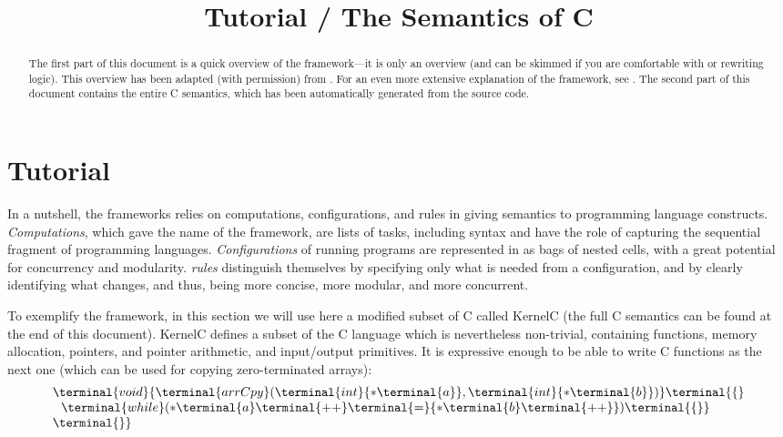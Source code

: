\documentclass{article}
\title{\K Tutorial \slash{} The Semantics of C}
\begin{document}
\maketitle

\begin{abstract}The first part of this document is a quick overview of the \K framework---it is only an overview (and can be skimmed if you are comfortable with \K or rewriting logic).  This overview has been adapted (with permission) from \citet{serbanuta-2010-thesis}.  For an even more extensive explanation of the \K framework, see \citet{rosu-serbanuta-2010-jlap}.  The second part of this document contains the entire C semantics, which has been automatically generated from the source code.
\end{abstract}
\pagebreak
\section{\K Tutorial}
In a nutshell, the \K frameworks relies on computations, configurations, and \K rules in giving semantics to programming language constructs.  
{\em Computations}, which gave the name of the framework, are lists of tasks, including syntax and have the role of capturing the sequential fragment of programming languages.  {\em Configurations} of running programs are represented in \K as bags of nested cells, with a great potential for concurrency and modularity.  {\em \K rules} distinguish themselves by specifying only what is needed from a configuration, and by clearly identifying what changes, and thus, being more concise, more modular, and more concurrent.

To exemplify the \K framework, in this section we will use here a modified subset of C called {\sc KernelC} (the full C semantics can be found at the end of this document).   {\sc KernelC} defines a subset of the C language which is nevertheless non-trivial, containing functions, memory allocation, pointers, and pointer arithmetic, and input/output primitives.  It is expressive enough to be able to write C functions as the next one (which can be used for copying zero-terminated arrays):
\[\begin{array}{l}
\terminal{void}
{
  {\terminal{arrCpy}
  }
  (\terminal{int}{
    \ast\terminal{a}
    }, \terminal{int}{
     \ast\terminal{b}
     }
     ) }
     \terminal{\{} \\
     \ \ \terminal{while}   (
     {  
       {\ast\terminal{a}}
       \terminal{++}
     }\terminal{=}
     {
     {\ast\terminal{b}}
     \terminal{++}
     }
     )\terminal{\{\}} 
   \\ \terminal{\}}
   \end{array}\]
   
\end{document}
